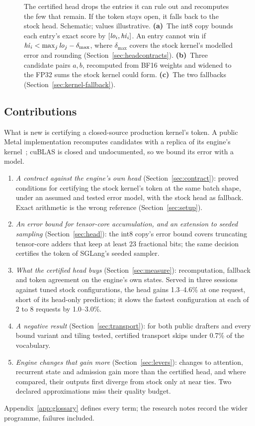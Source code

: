 \begin{figure}[t]
\centering
%
\caption{The certified head drops the entries it can rule out and recomputes the few that remain. If the token stays open, it falls back to the stock head. Schematic; values illustrative. \textbf{(a)}~The int8 copy bounds each entry's exact score by $[\mathit{lo}_i,\mathit{hi}_i]$. An entry cannot win if $\mathit{hi}_i<\max_j\mathit{lo}_j-\delta_{\max}$, where $\delta_{\max}$ covers the stock kernel's modelled error and rounding (Section~\ref{sec:headcontracts}). \textbf{(b)}~Three candidate pairs $a,b$, recomputed from BF16 weights and widened to the FP32 sums the stock kernel could form. \textbf{(c)}~The two fallbacks (Section~\ref{sec:kernel-fallback}).}
\label{fig:mechanism}
\end{figure}

\subsection{Contributions}\label{sec:contributions}
What is new is certifying a closed-source production kernel's token. A public Metal implementation recomputes candidates with a replica of its engine's kernel~\cite{lagunaprune}; cuBLAS is closed and undocumented, so we bound its error with a model.
\begin{enumerate}[leftmargin=1.2em,itemsep=.3ex]
\item \emph{A contract against the engine's own head} (Section~\ref{sec:contract}): proved conditions for certifying the stock kernel's token at the same batch shape, under an assumed and tested error model, with the stock head as fallback. Exact arithmetic is the wrong reference (Section~\ref{sec:setup}).
\item \emph{An error bound for tensor-core accumulation, and an extension to seeded sampling} (Section~\ref{sec:head}): the int8 copy's error bound covers truncating tensor-core adders that keep at least 23 fractional bits; the same decision certifies the token of SGLang's seeded sampler.
\item \emph{What the certified head buys} (Section~\ref{sec:measure}): recomputation, fallback and token agreement on the engine's own states. Served in three sessions against tuned stock configurations, the head gains 1.3--4.6\% at one request, short of its head-only prediction; it slows the fastest configuration at each of 2 to 8 requests by 1.0--3.0\%.
\item \emph{A negative result} (Section~\ref{sec:transport}): for both public drafters and every bound variant and tiling tested, certified transport skips under 0.7\% of the vocabulary.
\item \emph{Engine changes that gain more} (Section~\ref{sec:levers}): changes to attention, recurrent state and admission gain more than the certified head, and where compared, their outputs first diverge from stock only at near ties. Two declared approximations miss their quality budget.
\end{enumerate}
Appendix~\ref{app:glossary} defines every term; the research notes record the wider programme, failures included.

